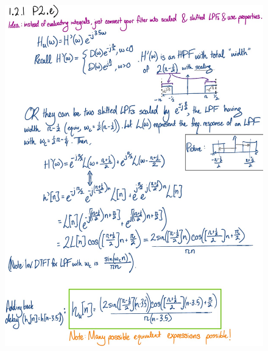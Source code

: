 \documentclass{article}
\begin{document}
\begin{figure}[h!]
\begin{center}
    \includegraphics[width=0.99 \textwidth]{figures/Solutions pg 4.jpg}
    \label{fig:old_solutions_4}
\end{center}
\end{figure}

\newpage
\end{document}
